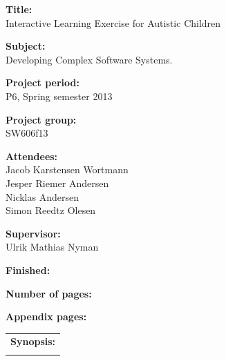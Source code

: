 \begin{titlingpage}
\begin{nopagebreak}
{\noindent\begin{minipage}[c]{0.4\textwidth}
	\begin{flushleft} 
	\begin{description}	
\item {\textbf{Title:}}\\
Interactive Learning Exercise for Autistic Children
\item {\textbf{Subject:}}\\
Developing Complex Software Systems.
\item {\textbf{Project period:}}\\
   P6, Spring semester 2013\\
  \hspace{4cm}
\item {\textbf{Project group:}}\\
  SW606f13\\
  \hspace{4cm}
\item {\textbf{Attendees:}}\\
Jacob Karstensen Wortmann \\
Jesper Riemer Andersen \\
Nicklas Andersen \\
Simon Reedtz Olesen \\

\item {\textbf{Supervisor:}}\\
Ulrik Mathias Nyman \\
\end{description}

\begin{description}
\item {\textbf{Finished:}}
\item {\textbf{Number of pages:}} \pageref{lastpage}
\item {\textbf{Appendix pages:}} 
\end{description}
\vfill
	\end{flushleft}
\end{minipage}
\begin{minipage}[c]{0.6\textwidth}
	\begin{flushright} 
		  \vspace{.15cm}
  \hfill 
  \begin{tabular}{l}
  {\textbf{Synopsis:}}\bigskip \\
  \fbox{
    \parbox{5.5cm}{\bigskip
     {\vfill{\small 
     \bigskip}}
     }}
   \end{tabular}
	\end{flushright}
\end{minipage}

}
\end{nopagebreak}
\end{titlingpage}
